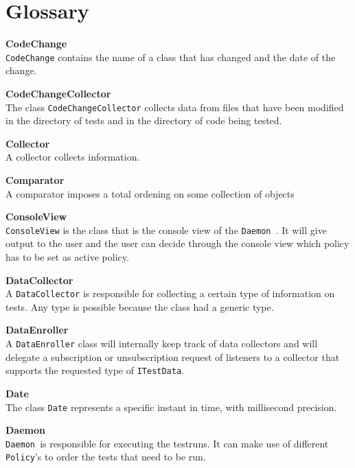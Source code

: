 \documentclass[i2]{oss}
\newcommand{\class}[1]{\texttt{#1}}
\newcommand{\Daemon}{\class{Daemon  }}
\newcommand{\gloss}[1]{\textbf{#1}}
\begin{document}
\section{Glossary}
\label{ssec:glossary}


\begin{description}
\item \gloss{CodeChange}\\
\class{CodeChange} contains the name of a class that has changed and the date of the change.

\item \gloss{CodeChangeCollector}\\
The class \class{CodeChangeCollector} collects data from files that have been modified in the directory of tests and in the directory of code being tested. 
	

\item \gloss{Collector}\\
A collector collects information.

\item \gloss{Comparator}\\
A comparator imposes a total ordening on some collection of objects

\item \gloss{ConsoleView}\\
\class{ConsoleView} is the class that is the console view of the \Daemon. It will give output to the user and the user can decide through the console view which policy has to be set as active policy.

\item \gloss{DataCollector}\\
A \class{DataCollector} is responsible for collecting a certain type of information on tests. Any type is possible because the class had a generic type.

\item \gloss{DataEnroller}\\
A \class{DataEnroller} class will internally keep track of data collectors and will delegate a subscription or unsubscription request of listeners to a collector that supports the requested type of \class{ITestData}.

\item \gloss{Date}\\
The class \class{Date} represents a specific instant in time, with millisecond precision.

\item \gloss{Daemon} \\
	\Daemon is responsible for executing the testruns. It can make use of different \class{Policy}'s to order the tests that need to be run.


\end{description}
\end{document}

